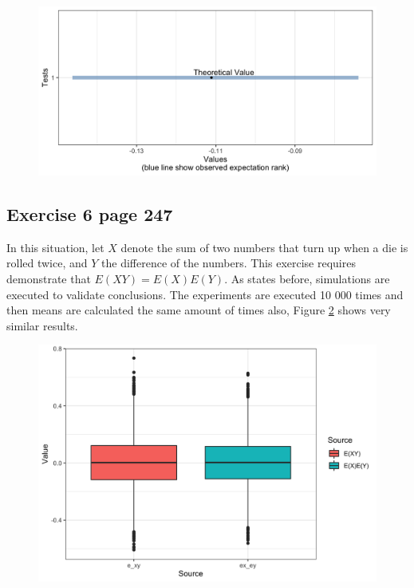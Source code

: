\documentclass[10pt,leter,openany]{article}
\begin{document}
\begin{figure}
	\begin{center}
		\includegraphics[scale=0.15]{img/line_1_247}
		\label{fig:line}
	\end{center}
\end{figure}

\subsection{Exercise 6 page 247}

In this situation, let $ X $ denote the sum of two numbers that turn up when a die is rolled twice, and $ Y $ the difference of the numbers. This exercise requires demonstrate that $ E(XY)=E(X)E(Y) $. As states before, simulations are executed to validate conclusions. The experiments are executed 10 000 times and then means are calculated the same amount of times also, Figure \ref{fig:box1} shows very similar results.

\begin{figure}
	\begin{center}
		\includegraphics[scale=0.18]{img/boxplot1}
		\label{fig:box1}
	\end{center}
\end{figure}
 
\end{document}
